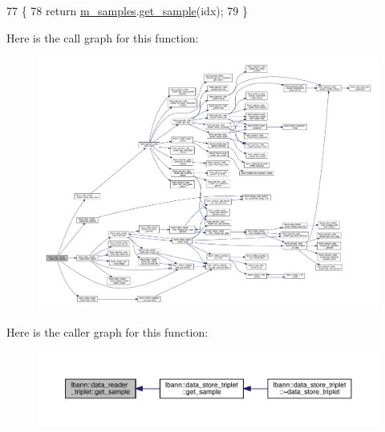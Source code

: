 \begin{DoxyCode}
77                                         \{
78     \textcolor{keywordflow}{return} \hyperlink{classlbann_1_1data__reader__triplet_a1f414c6d80f6e48fc91f98db0531f1f8}{m\_samples}.\hyperlink{classlbann_1_1offline__patches__npz_a9c8ad05ffdf0d44ee1c9b61740dd42e3}{get\_sample}(idx);
79   \}
\end{DoxyCode}
Here is the call graph for this function\+:\nopagebreak
\begin{figure}[H]
\begin{center}
\leavevmode
\includegraphics[width=350pt]{classlbann_1_1data__reader__triplet_a6ed35c191d890569db4865424b8b0e82_cgraph}
\end{center}
\end{figure}
Here is the caller graph for this function\+:\nopagebreak
\begin{figure}[H]
\begin{center}
\leavevmode
\includegraphics[width=350pt]{classlbann_1_1data__reader__triplet_a6ed35c191d890569db4865424b8b0e82_icgraph}
\end{center}
\end{figure}
\mbox{\label{classlbann_1_1data__reader__triplet_a7ff627eed9a4671129cbf7fb9ca11871}} 
